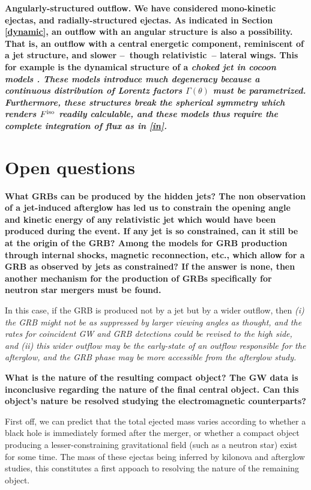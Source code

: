 \bf{Angularly-structured outflow.} We have considered mono-kinetic ejectas, and radially-structured ejectas. As indicated in Section  \ref{dynamic}, an outflow with an angular structure is also a possibility. That is, an outflow with a central energetic component, reminiscent of a jet structure, and slower --~though relativistic~-- lateral wings. This for example is the dynamical structure of a \it{choked jet} in cocoon models \citep{42, 5}. These models introduce much degeneracy because a continuous distribution of Lorentz factors $\Gamma(\theta)$ must be parametrized. Furthermore, these structures break the spherical symmetry which renders $F^{\rm{iso}}$ readily calculable, and these models thus require the complete integration of flux as in \ref{in}.

\section{Open questions}

\bf{What GRBs can be produced by the hidden jets? }The non observation of a jet-induced afterglow has led us to constrain the opening angle and kinetic energy of any relativistic jet which would have been produced during the event. If any jet is so constrained, can it still be at the origin of the GRB? Among the models for GRB production through internal shocks, magnetic reconnection, etc., which allow for a GRB as observed by jets as constrained? If the answer is none, then another mechanism for the production of GRBs specifically for neutron star mergers must be found.

In this case, if the GRB is produced not by a jet but by a wider outflow, then \it{(i)} the GRB might not be as suppressed by larger viewing angles as thought, and the rates for coincident GW and GRB detections could be revised to the high side, and \it{(ii)} this wider outflow may be the early-state of an outflow responsible for the afterglow, and the GRB phase may be more accessible from the afterglow study.

\bf{What is the nature of the resulting compact object? }The GW data is inconclusive regarding the nature of the final central object. Can this object's nature be resolved studying the electromagnetic counterparts?

First off, we can predict that the total ejected mass varies according to whether a black hole is immediately formed after the merger, or whether a compact object producing a lesser-constraining gravitational field (such as a neutron star) exist for some time. The mass of these ejectas being inferred by kilonova and afterglow studies, this constitutes a first appoach to resolving the nature of the remaining object.

